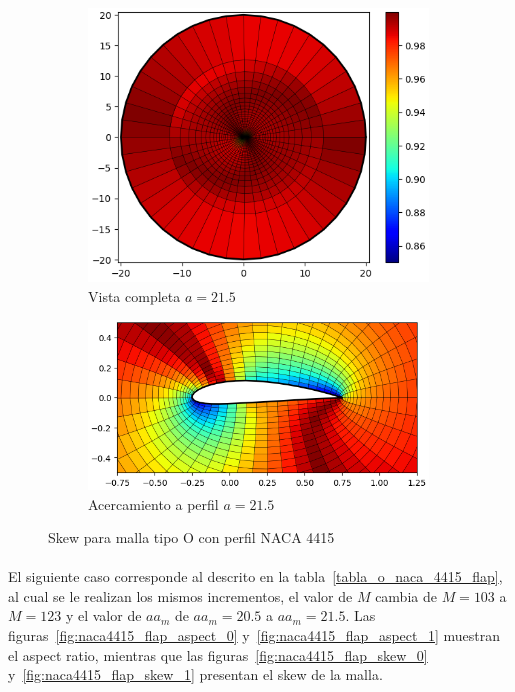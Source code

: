 \documentclass[letterpaper, openright, 12pt]{book}
\begin{document}
\begin{figure}[htbp!]
\begin{subfigure}[c]{0.48\textwidth}
            \includegraphics[keepaspectratio,
                width=0.99\textwidth]{./img/naca4415_aa_215_skew_far}
            \caption{Vista completa $a=21.5$}
            \label{fig:naca4415_aa_215_skew_far}
        \end{subfigure}
        \hfill
        \begin{subfigure}[c]{0.48\textwidth}
            \includegraphics[keepaspectratio,
                width=0.99\textwidth]{./img/naca4415_aa_215_skew_close}
            \caption{Acercamiento a perfil $a = 21.5$}
            \label{fig:naca4415_aa_215_skew_close}
        \end{subfigure}
        \caption{Skew para malla tipo O con perfil NACA 4415}
    \end{figure}

    \paragraph*{}
    El siguiente caso corresponde al descrito en la
    tabla~\ref{tabla_o_naca_4415_flap}, al cual se le realizan los mismos
    incrementos, el valor de $M$ cambia de $M=103$ a $M=123$ y el valor de
    $aa_m$ de $aa_m = 20.5$ a $aa_m = 21.5$. Las
    figuras~\ref{fig:naca4415_flap_aspect_0} y~\ref{fig:naca4415_flap_aspect_1}
    muestran el aspect ratio, mientras que las
    figuras~\ref{fig:naca4415_flap_skew_0} y~\ref{fig:naca4415_flap_skew_1}
    presentan el skew de la malla.
\end{document}
